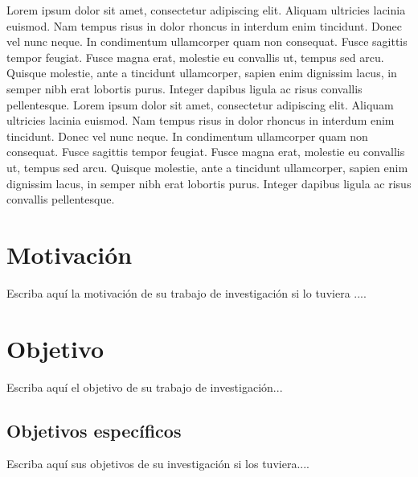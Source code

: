 Lorem ipsum dolor sit amet, consectetur adipiscing elit. Aliquam ultricies lacinia euismod. Nam tempus risus in dolor rhoncus in interdum enim tincidunt. Donec vel nunc neque. In condimentum ullamcorper quam non consequat. Fusce sagittis tempor feugiat. Fusce magna erat, molestie eu convallis ut, tempus sed arcu. Quisque molestie, ante a tincidunt ullamcorper, sapien enim dignissim lacus, in semper nibh erat lobortis purus. Integer dapibus ligula ac risus convallis pellentesque. Lorem ipsum dolor sit amet, consectetur adipiscing elit. Aliquam ultricies lacinia euismod. Nam tempus risus in dolor rhoncus in interdum enim tincidunt. Donec vel nunc neque. In condimentum ullamcorper quam non consequat. Fusce sagittis tempor feugiat. Fusce magna erat, molestie eu convallis ut, tempus sed arcu. Quisque molestie, ante a tincidunt ullamcorper, sapien enim dignissim lacus, in semper nibh erat lobortis purus. Integer dapibus ligula ac risus convallis pellentesque.


\section{Motivación}
Escriba aquí la motivación de su trabajo de investigación si lo tuviera ....


\section{Objetivo}
Escriba aquí el objetivo de su trabajo de investigación... 

\subsection{Objetivos específicos}
Escriba aquí sus objetivos de su investigación si los tuviera.... 
